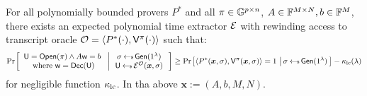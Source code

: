 \begin{lemma}[Soundness]\label{lem:linercheck_sound}
For all polynomially bounded provers $P^\ast$ and all $\pi\in \mathbb{G}^{p\times n}$,
$A\in \mathbb{F}^{M\times N}, b\in \mathbb{F}^M$, there exists an expected polynomial time
extractor $\mathcal{E}$ with rewinding access to transcript oracle $\mathcal{O}=\langle
P^\ast(\cdot),\mathsf{V}^\pi(\cdot)\rangle$ such that:
{\small
\begin{align*}
\condprob{\begin{array}{c}
\ewit=\open(\pi)\wedge A\wit=b \\
\text{ where } \wit=\dec(\ewit)
\end{array}
}{
\begin{array}{c}
\sigma\sample \gen(\secparam) \\
\ewit\sample \extr^{\mc{O}}(\bm{x},\sigma)
\end{array}}\geq
\condprob{\innp{P^\ast(\bm{x},\sigma)}{\verifier^\pi(\bm{x},\sigma)}=1}
{\sigma\sample\gen(\secparam)}-\kappa_{\rm lc}(\secpar)
\end{align*}
}
for negligible function $\kappa_{\rm lc}$. In tha above $\bm{x} := (A,b,M,N)$.
\end{lemma}

